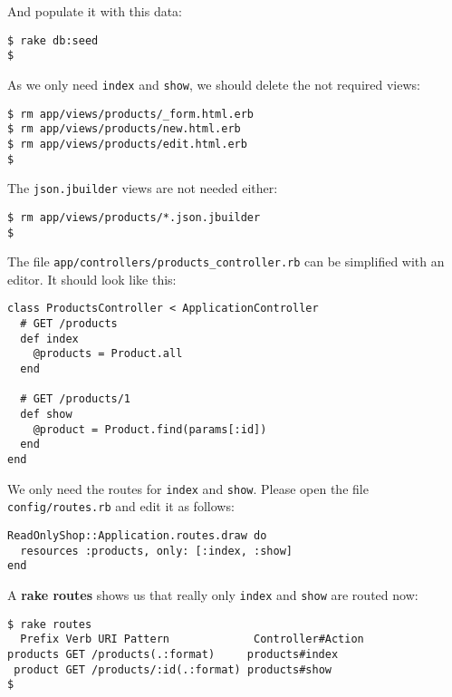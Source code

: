 \documentclass[a4paper]{book}
\begin{document}
And populate it with this data:

\begin{shaded}\begin{verbatim}
$ rake db:seed
$
\end{verbatim}\end{shaded}

As we only need \texttt{index} and \texttt{show}, we should delete the not required views:

\begin{shaded}\begin{verbatim}
$ rm app/views/products/_form.html.erb
$ rm app/views/products/new.html.erb
$ rm app/views/products/edit.html.erb
$
\end{verbatim}\end{shaded}

The \texttt{json.jbuilder} views are not needed either:

\begin{shaded}\begin{verbatim}
$ rm app/views/products/*.json.jbuilder
$
\end{verbatim}\end{shaded}

The file \texttt{app/controllers/products\_controller.rb} can be simplified with an editor. It should look like this:

\begin{shaded}\begin{verbatim}
class ProductsController < ApplicationController
  # GET /products
  def index
    @products = Product.all
  end

  # GET /products/1
  def show
    @product = Product.find(params[:id])
  end
end
\end{verbatim}\end{shaded}

We only need the routes for \texttt{index} and \texttt{show}. Please open the file \texttt{config/routes.rb} and edit it as follows:

\begin{shaded}\begin{verbatim}
ReadOnlyShop::Application.routes.draw do
  resources :products, only: [:index, :show]
end
\end{verbatim}\end{shaded}

A \textbf{rake routes} shows us that really only \texttt{index} and \texttt{show} are routed now:

\begin{shaded}\begin{verbatim}
$ rake routes
  Prefix Verb URI Pattern             Controller#Action
products GET /products(.:format)     products#index
 product GET /products/:id(.:format) products#show
$
\end{verbatim}\end{shaded}
\end{document}
